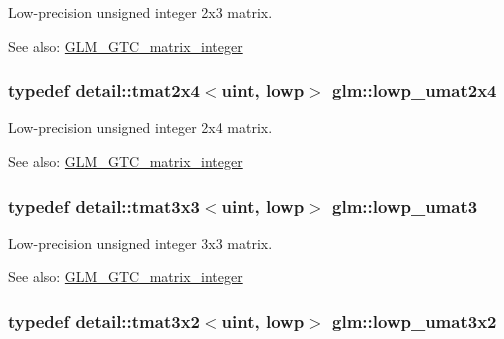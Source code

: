Low-precision unsigned integer 2x3 matrix. \begin{Desc}
\item[See also:]\hyperlink{group__gtc__matrix__integer}{GLM\_\-GTC\_\-matrix\_\-integer} \end{Desc}
\hypertarget{group__gtc__matrix__integer_g581eef861234e918e88377fd331e37e6}{
\subsubsection[lowp\_\-umat2x4]{\setlength{\rightskip}{0pt plus 5cm}typedef detail::tmat2x4$<$uint, lowp$>$ {\bf glm::lowp\_\-umat2x4}}}
\label{group__gtc__matrix__integer_g581eef861234e918e88377fd331e37e6}


Low-precision unsigned integer 2x4 matrix. \begin{Desc}
\item[See also:]\hyperlink{group__gtc__matrix__integer}{GLM\_\-GTC\_\-matrix\_\-integer} \end{Desc}
\hypertarget{group__gtc__matrix__integer_g7160c0ac500826224d3baf1003c0432c}{
\subsubsection[lowp\_\-umat3]{\setlength{\rightskip}{0pt plus 5cm}typedef detail::tmat3x3$<$uint, lowp$>$ {\bf glm::lowp\_\-umat3}}}
\label{group__gtc__matrix__integer_g7160c0ac500826224d3baf1003c0432c}


Low-precision unsigned integer 3x3 matrix. \begin{Desc}
\item[See also:]\hyperlink{group__gtc__matrix__integer}{GLM\_\-GTC\_\-matrix\_\-integer} \end{Desc}
\hypertarget{group__gtc__matrix__integer_g5874e964b1816f230215df28d22ea7de}{
\subsubsection[lowp\_\-umat3x2]{\setlength{\rightskip}{0pt plus 5cm}typedef detail::tmat3x2$<$uint, lowp$>$ {\bf glm::lowp\_\-umat3x2}}}
\label{group__gtc__matrix__integer_g5874e964b1816f230215df28d22ea7de}


